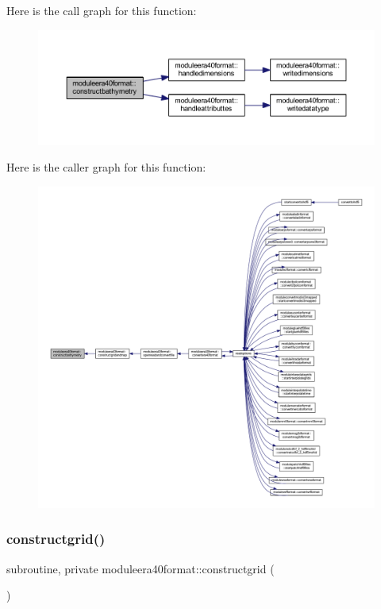 Here is the call graph for this function\+:\nopagebreak
\begin{figure}[H]
\begin{center}
\leavevmode
\includegraphics[width=350pt]{namespacemoduleera40format_a73e47fa652795fc4885fa7d6a5c34503_cgraph}
\end{center}
\end{figure}
Here is the caller graph for this function\+:\nopagebreak
\begin{figure}[H]
\begin{center}
\leavevmode
\includegraphics[width=350pt]{namespacemoduleera40format_a73e47fa652795fc4885fa7d6a5c34503_icgraph}
\end{center}
\end{figure}
\mbox{\label{namespacemoduleera40format_ad847a1e5d762ac9c9f77372614efda16}} 
\subsubsection{\texorpdfstring{constructgrid()}{constructgrid()}}
{\footnotesize\ttfamily subroutine, private moduleera40format\+::constructgrid (\begin{DoxyParamCaption}{ }\end{DoxyParamCaption})\hspace{0.3cm}{\ttfamily [private]}}

